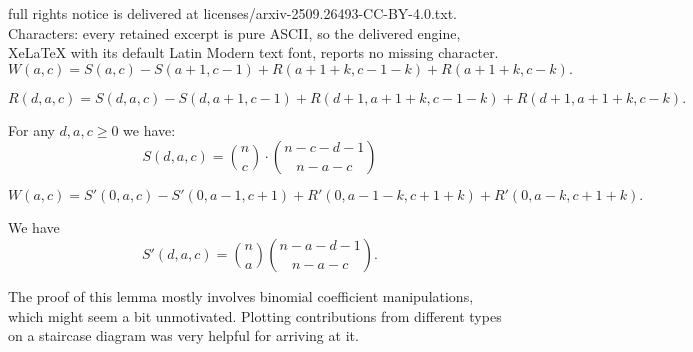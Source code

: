 \documentclass[10pt,a4paper]{amsart}
\begin{document}
full rights notice is delivered at licenses/arxiv-2509.26493-CC-BY-4.0.txt. Characters: every retained excerpt is pure ASCII, so the delivered engine, XeLaTeX with its default Latin Modern text font, reports no missing character.
\begin{equation}
\label{eq_step_1}
    W(a, c) = S(a, c) - S(a+1, c-1) + R(a+1+k, c-1-k) + R(a+1+k, c-k).
\end{equation}

\begin{equation}
\label{eq_step_2}
    R(d, a, c)=S(d, a, c) - S(d, a+1, c-1) + R(d+1, a+1+k, c-1-k)+ R(d+1, a+1+k, c-k).
\end{equation}

\begin{lemma}
\label{s_closed_form}
    For any $d, a, c \geqslant 0$ we have:
    \begin{equation*}
        S(d, a, c) = \binom{n}{c} \cdot \binom{n-c-d-1}{n-a-c}
    \end{equation*}
\end{lemma}

\begin{equation}
\label{eq_step_1_prime}
    W(a, c) = S'(0, a, c) - S'(0, a-1, c+1) + R'(0, a-1-k, c+1+k) + R'(0, a-k, c+1+k).
\end{equation}

\begin{lemma}
\label{s_closed_form_prime}
    We have
    \begin{equation*}
        S'(d, a, c) = \binom{n}{a} \binom{n-a-d-1}{n-a-c}.
    \end{equation*}
\end{lemma}

\begin{remark}
    The proof of this lemma mostly involves binomial coefficient manipulations, which might seem a bit unmotivated. Plotting contributions from different types on a staircase diagram was very helpful for arriving at it.
\end{remark}
\end{document}
